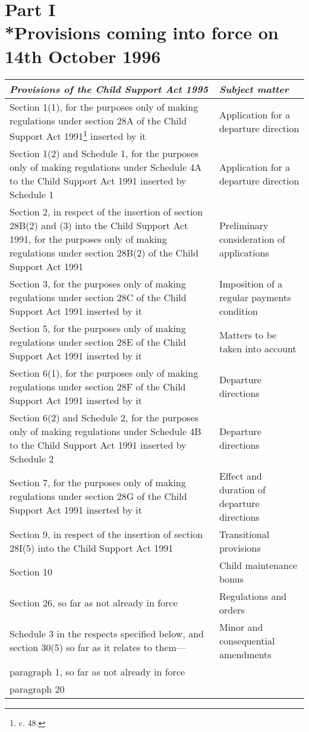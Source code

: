\documentclass[a4paper]{article}
\newcommand{\parthead}{}
\begin{document}
\section[Part I --- Provisions coming into force on 14th October 1996]{Part I\\*Provisions coming into force on 14th October 1996}

\renewcommand\parthead{--- Schedule Part I}

\begin{longtable}{p{249.57385pt}p{71.43202pt}}
\hline
\itshape Provisions of the Child Support Act 1995 & \itshape Subject matter\\
\hline
\endhead
\hline
\endlastfoot
Section 1(1), for the purposes only of making regulations under section 28A of the Child Support Act 1991\footnote{\frenchspacing 1991 c. 48.} inserted by it&Application for a departure direction\\
Section 1(2) and Schedule 1, for the purposes only of making regulations under Schedule 4A to the Child Support Act 1991 inserted by Schedule 1&Application for a departure direction\\
Section 2, in respect of the insertion of section 28B(2) and (3) into the Child Support Act 1991, for the purposes only of making regulations under section 28B(2) of the Child Support Act 1991&Preliminary consideration of applications\\
Section 3, for the purposes only of making regulations under section 28C of the Child Support Act 1991 inserted by it&Imposition of a regular payments condition\\
Section 5, for the purposes only of making regulations under section 28E of the Child Support Act 1991 inserted by it&Matters to be taken into account\\
Section 6(1), for the purposes only of making regulations under section 28F of the Child Support Act 1991 inserted by it&Departure directions\\
Section 6(2) and Schedule 2, for the purposes only of making regulations under Schedule 4B to the Child Support Act 1991 inserted by Schedule 2&Departure directions\\
Section 7, for the purposes only of making regulations under section 28G of the Child Support Act 1991 inserted by it&Effect and duration of departure directions\\
Section 9, in respect of the insertion of section 28I(5) into the Child Support Act 1991&Transitional provisions\\
Section 10&Child maintenance bonus\\
Section 26, so far as not already in force&Regulations and orders\\
Schedule 3 in the respects specified below, and section 30(5) so far as it relates to them—&Minor and consequential amendments\\
\hspace{1em} paragraph 1, so far as not already in force\\
\hspace{1em} paragraph 20\\
\end{longtable}
\end{document}
